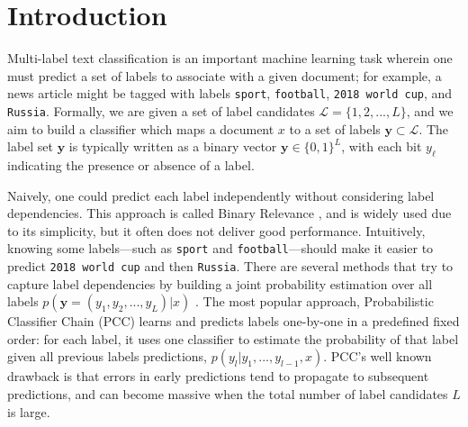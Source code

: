 \section{Introduction}
\label{sec:Introduction}
Multi-label text classification is an important machine learning task wherein one must predict a set of labels to associate with a given document; for example, a news article might be tagged with labels \texttt{sport}, \texttt{football}, \texttt{2018 world cup}, and \texttt{Russia}. 
Formally, we are given a set
of label candidates $\mathcal{L}=\{1,2,...,L\}$,  and we aim to build a classifier 
which maps a document $x$ to a set of labels $\mathbf{y}\subset \mathcal{L}$. The label set $\mathbf{y}$ is typically written as a binary vector $\mathbf{y}\in \{0,1\}^L$, with each bit $y_{\ell}$
indicating the presence or absence of a label.

Naively, one could predict each label independently without considering label dependencies. This approach is called Binary Relevance \cite{DBLP:journals/pr/BoutellLSB04,tsoumakas2007multi}, and is widely used  due to its simplicity, but it often does not deliver good performance.  Intuitively, knowing some labels---such as \texttt{sport} and \texttt{football}---should make it easier to predict \texttt{2018 world cup} and then \texttt{Russia}.  There are several methods that try to capture label dependencies by building a joint probability estimation over all labels  $p(\mathbf{y}=(y_1,y_2,...,y_L)|x)$ \cite{ghamrawi2005collective,read2009classifier,DBLP:conf/icml/DembczynskiCH10,li2016conditional}. 
The most popular approach, Probabilistic Classifier Chain (PCC) \cite{DBLP:conf/icml/DembczynskiCH10} learns and predicts labels one-by-one in a predefined fixed order: for each label, it uses one classifier to estimate the probability of that label given all previous labels predictions, $p(y_l|y_1,...,y_{l-1},x)$. PCC's well known drawback is that errors in early predictions tend to propagate to subsequent predictions, and can become massive when the total number of label candidates $L$ is large. 






